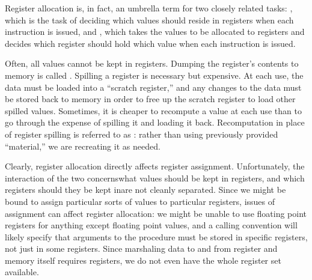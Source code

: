 Register allocation is, in fact, an umbrella term for two closely related tasks: , which is the task of deciding which values should reside in registers when each instruction is issued, and , which takes the values to be allocated to registers and decides which register should hold which value when each instruction is issued.

Often, all values cannot be kept in registers. Dumping the register's contents to memory is called . Spilling a register is necessary but expensive. At each use, the data must be loaded into a ``scratch register,'' and any changes to the data must be stored back to memory in order to free up the scratch register to load other spilled values. Sometimes, it is cheaper to recompute a value at each use than to go through the expense of spilling it and loading it back. Recomputation in place of register spilling is referred to as : rather than using previously provided ``material,'' we are recreating it as needed.

Clearly, register allocation directly affects register assignment. Unfortunately, the interaction of the two concerns\empause what values should be kept in registers, and which registers should they be kept in\empause are not cleanly separated. Since we might be bound to assign particular sorts of values to particular registers, issues of assignment can affect register allocation: we might be unable to use floating point registers for anything except floating point values, and a calling convention will likely specify that arguments to the procedure must be stored in specific registers, not just in some registers. Since marshaling data to and from register and memory itself requires registers, we do not even have the whole register set available.

